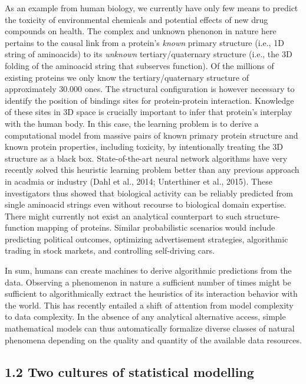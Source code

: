 \documentclass[authoryear,review,3p]{elsarticle}
\begin{document}
As an example from human biology,
we currently have only few means to predict the
toxicity of environmental chemicals and
potential effects of new drug compounds on health.
%
The complex and unknown phenonon in nature here pertains
to the causal link from
a protein's \textit{known} primary structure
(i.e., 1D string of aminoacids)
to
its \textit{unknown} tertiary/quaternary structure
(i.e., the 3D folding of the aminoacid string that subserves function).
%
Of the millions of existing proteins
we only know the tertiary/quaternary structure of
approximately 30.000 ones.
The structural configuration is however necessary to identify the position of
bindings sites for protein-protein interaction.
Knowledge of these sites in 3D space is crucially important
to infer that protein's interplay with the human body.
%
In this case,
the learning problem is to
derive a computational model from
massive pairs of known primary protein structure and
known protein properties, including toxicity,
by intentionally treating the 3D structure
as a black box.
%
State-of-the-art neural network algorithms
have very recently solved this heuristic learning problem
better than any previous approach in acadmia or industry
(Dahl et al., 2014; Unterthiner et al., 2015).
These investigators thus showed that biological activity
can be reliably predicted from single aminoacid strings
even without recourse to biological domain expertise.
%
There might currently not exist
an analytical counterpart to such
structure-function mapping of proteins.
%
%
Similar probabilistic scenarios would include predicting
political outcomes,
optimizing advertisement strategies,
algorithmic trading in stock markets, and
controlling self-driving cars.


In sum,
humans can create machines to derive
algorithmic predictions from the data.
Observing a phenomenon in nature a sufficient number of times
might be sufficient to
algorithmically extract
the heuristics of its interaction behavior with the world.
This has recently entailed a shift
of attention from model complexity to data complexity.
In the absence of any analytical alternative access,
simple mathematical models can thus automatically
formalize diverse classes of natural phenomena
depending on the quality and quantity of
the available data resources.


\subsection*{1.2 Two cultures of statistical modelling}
\end{document}
